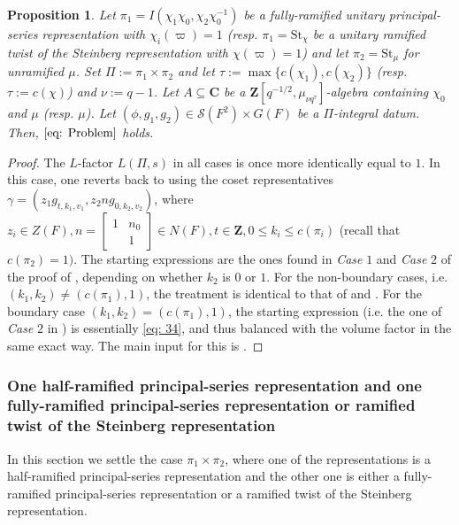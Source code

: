 \documentclass{amsart}
\theoremstyle{plain}
\newtheorem{prop}[thm]{Proposition}
\theoremstyle{plain}
\theoremstyle{remark}
\begin{document}
\begin{prop}
    Let $\pi_1=I(\chi_1\chi_0,\chi_2\chi_0^{-1})$ be a fully-ramified unitary principal-series representation with $\chi_i(\varpi)=1$ \emph{(}resp. $\pi_1=\mathrm{St}_\chi$ be a unitary ramified twist of the Steinberg representation with $\chi(\varpi)=1$\emph{)} and let $\pi_2=\mathrm{St}_\mu$ for unramified $\mu$. Set $\Pi:=\pi_1\times \pi_2$ and let $\tau:=\max\{c(\chi_1),c(\chi_2)\}$ \emph{(}resp. $\tau:=c(\chi)$\emph{)} and $\nu:=q-1$. Let $A\subseteq\mathbf{C}$ be a $\mathbf{Z}[q^{-1/2},\mu_{\nu q^\tau}]$-algebra containing $\chi_0$ and $\mu$ \emph{(}resp. $\mu$\emph{)}. Let $(\phi,g_1,g_2)\in\mathcal{S}(F^2)\times G(F)$ be a $\Pi$-integral datum. Then, $\eqref{eq: Problem}$ holds.
\end{prop}
\begin{proof}
    The $L$-factor $L(\Pi,s)$ in all cases is once more identically equal to $1$. In this case, one reverts back to using the coset representatives $\gamma=(z_1g_{t,k_1,v_1},z_2ng_{0,k_2,v_2})$, where $z_i\in Z(F),n=\left[\begin{smallmatrix}
            1 & n_0\\
            & 1
        \end{smallmatrix}\right]\in N(F),t\in\mathbf{Z}, 0\leq k_i\leq c(\pi_i)$ (recall that $c(\pi_2)=1)$. The starting expressions 
        are the ones found in \textit{Case} $1$ and \textit{Case} $2$ of the proof of , depending on whether $k_2$ is $0$ or $1$. For the non-boundary cases, i.e. $(k_1,k_2)\neq (c(\pi_1),1)$, the treatment is identical to that of  and . For the boundary case $(k_1,k_2)=(c(\pi_1),1)$, the starting expression (i.e. the one of \textit{Case} $2$ in ) is essentially \eqref{eq: 34}, and thus balanced with the volume factor in the same exact way. The main input for this is \cite[Lemma $3.3$, Lemma $3.5$ \& Lemma $3.6$]{Assing_2018}.
        \end{proof}

\subsubsection{One half-ramified principal-series representation and one fully-ramified principal-series representation or ramified twist of the Steinberg representation}

In this section we settle the case $\pi_1\times \pi_2$, where one of the representations is a half-ramified principal-series representation and the other one is either a fully-ramified principal-series representation or a ramified twist of the Steinberg representation.
\end{document}
